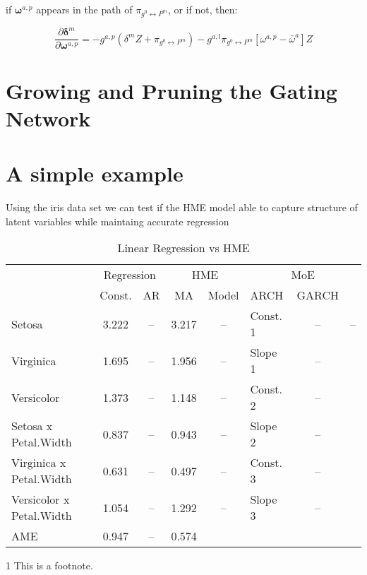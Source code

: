 \documentclass[12pt]{article}
\newcommand{\mean}[1]{\bar{#1}}
\newcommand{\gateprod}[2]{\pi_{#1 \longleftrightarrow #2}}
\begin{document}
if $\boldsymbol{\omega}^{a,p}$ appears in the path of $\gateprod{g^{0}}{P^{m}}$, or if not,
then:

\begin{equation}
  \frac{\partial \boldsymbol{\delta}^{m}}{\partial \boldsymbol{\omega}^{a,p}} = -g^{a, p} (\delta^{m} Z + \gateprod{g^{0}}{P^{m}}) - g^{a,l} \gateprod{g^{0}}{P^{m}} [\omega^{a,p} - \mean{\omega}^{a}] Z
\end{equation}


\section{Growing and Pruning the Gating Network} \label{sec:NetworkGrowth}


\section{A simple example} \label{sec:SimpleExample}

Using the iris data set we can test if the HME model able to capture
structure of latent variables while maintaing accurate regression

\begin{table}
	\caption{Linear Regression vs HME}
	\begin{threeparttable}
		\begin{tabular}[l]{l c c c c l c c}
	    \hline
	& \multicolumn{2}{c}{Regression}  & \multicolumn{2}{c}{HME}  & \multicolumn{3}{c}{MoE} \\
			                       & Const. & AR & MA & Model & ARCH & GARCH     \\
	\hline
  Setosa                   & 3.222  & -- & 3.217 & -- & Const. 1 & --    & --        \\
  Virginica                & 1.695  & -- & 1.956 & -- & Slope 1 & --           \\ 
  Versicolor               & 1.373  & -- & 1.148 & -- & Const. 2    & --           \\
  Setosa x Petal.Width     & 0.837  & -- & 0.943 & -- & Slope 2    & --            \\
  Virginica x Petal.Width  & 0.631  & -- & 0.497 & -- & Const. 3    & --           \\
  Versicolor x Petal.Width & 1.054  & -- & 1.292 & -- & Slope 3    & --          \\
  AME                      & 0.947  & -- & 0.574   &    &       &                \\
	\hline
		\end{tabular}
		\begin{tablenotes}
			\item[1]{\footnotesize This is a footnote.}
		\end{tablenotes}
	\end{threeparttable}
\end{table}
\end{document}
